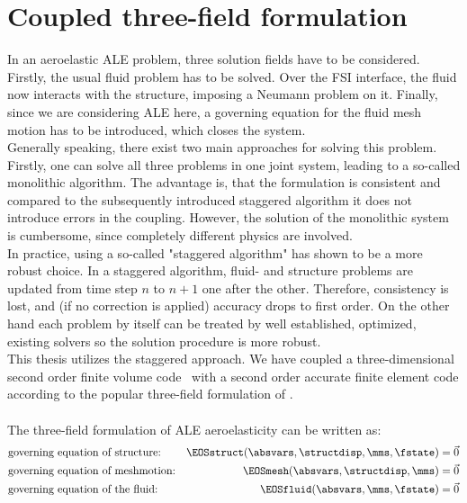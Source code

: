\documentclass[../main.tex]{subfiles}
\begin{document}
\section{Coupled three-field formulation}\label{sec:3_field_formulation}
In an aeroelastic ALE problem, three solution fields have to be considered. Firstly, the usual fluid problem has to be solved. Over the \ac{FSI} interface, the fluid now interacts with the structure, imposing a Neumann problem on it. Finally, since we are considering \ac{ALE} here, a governing equation for the fluid mesh motion has to be introduced, which closes the system.\\
Generally speaking, there exist two main approaches for solving this problem. Firstly, one can solve all three problems in one joint system, leading to a so-called monolithic algorithm. The advantage is, that the formulation is consistent and compared to the subsequently introduced staggered algorithm it does not introduce errors in the coupling. However, the solution of the monolithic system is cumbersome, since completely different physics are involved.\\
In practice, using a so-called "staggered algorithm" has shown to be a more robust choice. In a staggered algorithm, fluid- and structure problems are updated from time step $n$ to $n+1$ one after the other. Therefore, consistency is lost, and (if no correction is applied) accuracy drops to first order. On the other hand each problem by itself can be treated by well established, optimized, existing solvers so the solution procedure is more robust.\\
This thesis utilizes the staggered approach. We have coupled a three-dimensional second order finite volume code~\cite{Aerof} with a second order accurate finite element code\cite{Aeros} according to the popular three-field formulation of \cite{Farhat1995}.\\
 \\
The three-field formulation of \ac{ALE} aeroelasticity can be written as:
\begin{align}
&\text{governing equation of structure:}  &\EOSstruct (\absvars,\structdisp,\mms,\fstate) = \vec{0} \label{eq:3field_structure}\\
&\text{governing equation of meshmotion:} &\EOSmesh   (\absvars,\structdisp,\mms)         = \vec{0} \label{eq:3field_mesh}\\
&\text{governing equation of the fluid:}  &\EOSfluid  (\absvars,\mms,\fstate)             = \vec{0} \label{eq:3field_fluid}
\end{align}
\end{document}
